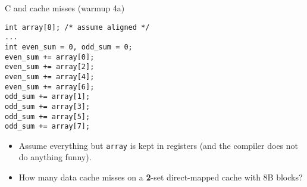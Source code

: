 
\begin{frame}[fragile,label=arrayMissesWarmup4]{C and cache misses (warmup 4a)}
\begin{lstlisting}[style=smaller]
int array[8]; /* assume aligned */
...
int even_sum = 0, odd_sum = 0;
even_sum += array[0];
even_sum += array[2];
even_sum += array[4];
even_sum += array[6];
odd_sum += array[1];
odd_sum += array[3];
odd_sum += array[5];
odd_sum += array[7];
\end{lstlisting}
\begin{itemize}
\item {\small
Assume everything but {\tt array} is kept in registers (and the compiler does not do
anything funny).}
\item How many data cache misses on a \textbf{2}-set direct-mapped cache with 8B blocks?
\end{itemize}
\end{frame}

